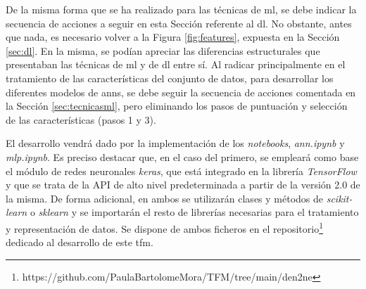 De la misma forma que se ha realizado para las técnicas de \gls{ml}, se debe indicar la secuencia de acciones a seguir en esta Sección referente al \gls{dl}. No obstante, antes que nada, es necesario volver a la Figura \ref{fig:features}, expuesta en la Sección \ref{sec:dl}. En la misma, se podían apreciar las diferencias estructurales que presentaban las técnicas de \gls{ml} y de \gls{dl} entre sí. Al radicar principalmente en el tratamiento de las características del conjunto de datos, para desarrollar los diferentes modelos de \gls{ann}s, se debe seguir la secuencia de acciones comentada en la Sección \ref{sec:tecnicasml}, pero eliminando los pasos de puntuación y selección de las características (pasos 1 y 3).

\vspace{3mm}

El desarrollo vendrá dado por la implementación de los \textit{notebooks}, \textit{ann.ipynb} y \textit{mlp.ipynb}. Es preciso destacar que, en el caso del primero, se empleará como base el módulo de redes neuronales \textit{keras}, que está integrado en la librería \textit{TensorFlow} y que se trata de la API de alto nivel predeterminada a partir de la versión 2.0 de la misma. De forma adicional, en ambos se utilizarán clases y métodos de \textit{scikit-learn} o \textit{sklearn} y se importarán el resto de librerías necesarias para el tratamiento y representación de datos. Se dispone de ambos ficheros en el repositorio\footnote{https://github.com/PaulaBartolomeMora/TFM/tree/main/den2ne} dedicado al desarrollo de este \gls{tfm}.




